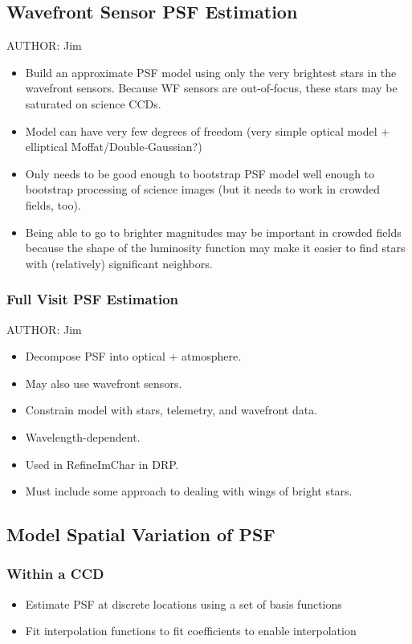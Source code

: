 \subsection{Wavefront Sensor PSF Estimation}
\label{sec:acWavefrontSensorPSF}
AUTHOR: Jim
\begin{itemize}
\item Build an approximate PSF model using only the very brightest stars in the wavefront sensors.  Because WF sensors are out-of-focus, these stars may be saturated on science CCDs.
\item Model can have very few degrees of freedom (very simple optical model + elliptical Moffat/Double-Gaussian?)
\item Only needs to be good enough to bootstrap PSF model well enough to bootstrap processing of science images (but it needs to work in crowded fields, too).
\item Being able to go to brighter magnitudes may be important in crowded fields because the shape of the luminosity function may make it easier to find stars with (relatively) significant neighbors.
\end{itemize}

\subsubsection{Full Visit PSF Estimation}
\label{sec:acFullVisitPSF}
AUTHOR: Jim
\begin{itemize}
\item Decompose PSF into optical + atmosphere.
\item May also use wavefront sensors.
\item Constrain model with stars, telemetry, and wavefront data.
\item Wavelength-dependent.
\item Used in RefineImChar in DRP.
\item Must include some approach to dealing with wings of bright stars.
\end{itemize}

\subsection{Model Spatial Variation of PSF}
\subsubsection{Within a CCD}
\begin{itemize}
\item Estimate PSF at discrete locations using a set of basis functions
\item Fit interpolation functions to fit coefficients to enable interpolation
\end{itemize}

